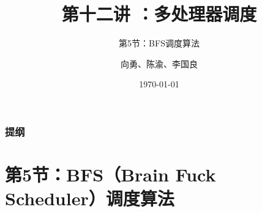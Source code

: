 


\title[第12讲]{第十二讲 ：多处理器调度} %
\subtitle{第5节：BFS调度算法}
\author{向勇、陈渝、李国良} %
\date{\today} %




\begin{frame}
\titlepage %
\end{frame}

\begin{frame}
\frametitle{提纲} %
\tableofcontents %
\end{frame}
\section{第5节：BFS（Brain Fuck Scheduler）调度算法} %
